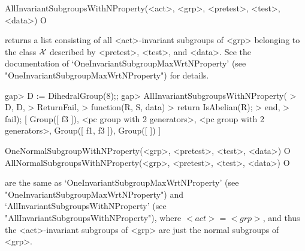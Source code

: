 \>AllInvariantSubgroupsWithNProperty(<act>, <grp>, <pretest>, <test>, <data>) O

returns a list consisting of all <act>-invariant subgroups of <grp> belonging 
to the class $\cal X$ described by <pretest>, <test>, and <data>. See
the documentation of `OneInvariantSubgroupMaxWrtNProperty' (see
"OneInvariantSubgroupMaxWrtNProperty") for details.

\beginexample
gap> D := DihedralGroup(8);;
gap> AllInvariantSubgroupsWithNProperty(
> D, D,
>     ReturnFail,
>     function(R, S, data)
>         return IsAbelian(R);
>     end,
>     fail);
[ Group([ f3 ]), <pc group with 2 generators>, <pc group with 2 generators>,
  Group([ f1, f3 ]), Group([  ]) ]
\endexample



\>OneNormalSubgroupWithNProperty(<grp>, <pretest>, <test>, <data>) O
\>AllNormalSubgroupsWithNProperty(<grp>, <pretest>, <test>, <data>) O

are the same as `OneInvariantSubgroupMaxWrtNProperty' (see
"OneInvariantSubgroupMaxWrtNProperty")
and  `AllInvariantSubgroupsWithNProperty' (see
"AllInvariantSubgroupsWithNProperty"), where $<act> = <grp>$, and thus the
<act>-invariant subgroups of <grp> are just the normal subgroups of <grp>.



